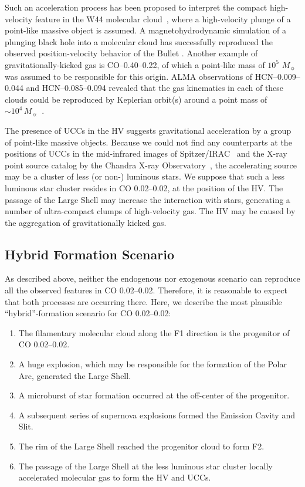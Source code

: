 \documentclass[twocolumn]{aastex631}
\begin{document}
Such an acceleration process has been proposed to interpret the compact high-velocity feature in the W44 molecular cloud~\citep[``Bullet";][]{Yamada17}, where a high-velocity plunge of a point-like massive object is assumed. A magnetohydrodynamic simulation of a plunging black hole into a molecular cloud has successfully reproduced the observed position-velocity behavior of the Bullet \citep{Nomura18}. Another example of gravitationally-kicked gas is CO--0.40--0.22, of which a point-like mass of $10^5$ $M_{\sun}$ was assumed to be responsible for this origin\citep{Oka16}. ALMA observations of HCN--0.009--0.044 and HCN--0.085--0.094 revealed that the gas kinematics in each of these clouds could be reproduced by Keplerian orbit(s) around a point mass of $\sim\! 10^4\,M_{\sun}$~\citep{Takekawa19,Takekawa20}.

The presence of UCCs in the HV suggests gravitational acceleration by a group of point-like massive objects. Because we could not find any counterparts at the positions of UCCs in the mid-infrared images of Spitzer/IRAC~\citep{Stolovy06, Churchwell09} and the X-ray point source catalog by the Chandra X-ray Observatory~\citep{Muno09}, the accelerating source may be a cluster of less (or non-) luminous stars. We suppose that such a less luminous star cluster resides in CO 0.02--0.02, at the position of the HV. The passage of the Large Shell may increase the interaction with stars, generating a number of ultra-compact clumps of high-velocity gas. The HV may be caused by the aggregation of gravitationally kicked gas. 

\subsection{Hybrid Formation Scenario}
As described above, neither the endogenous nor exogenous scenario can reproduce all the observed features in CO 0.02--0.02. Therefore, it is reasonable to expect that both processes are occurring there. Here, we describe the most plausible ``hybrid''-formation scenario for CO 0.02--0.02:  
\begin{enumerate}
\setlength{\itemsep}{0mm}
\setlength{\parsep}{0mm}

\item The filamentary molecular cloud along the F1 direction is the progenitor of CO 0.02--0.02.
\item A huge explosion, which may be responsible for the formation of the Polar Arc, generated the Large Shell.
\item A microburst of star formation occurred at the off-center of the progenitor.
\item A subsequent series of supernova explosions formed the Emission Cavity and Slit.
\item The rim of the Large Shell reached the progenitor cloud to form F2.
\item The passage of the Large Shell at the less luminous star cluster locally accelerated molecular gas to form the HV and UCCs.
\end{enumerate}
\end{document}
